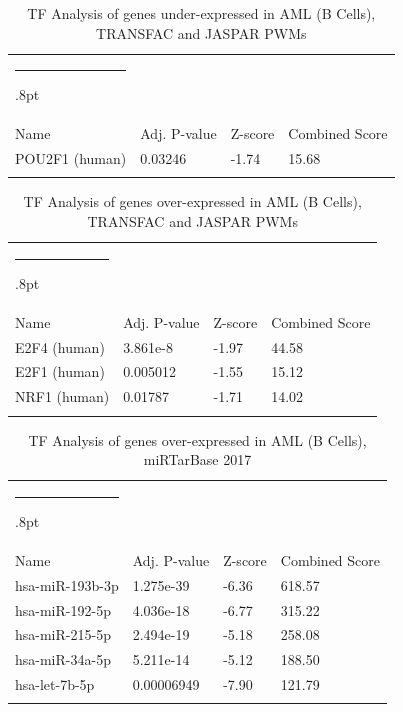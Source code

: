 \documentclass[3p,authoryear,preprint,12pt]{elsarticle}
\makeatletter
\def\hlinewd#1{%
  \noalign{\ifnum0=`}\fi\hrule \@height #1%
  \futurelet\reserved@a\@xhline}
\def\tbltoprule{\hlinewd{.8pt}\\[-12pt]}
\def\tblbottomrule{\noalign{\vspace*{6pt}}\hline\noalign{\vspace*{2pt}}}
\def\tblmidrule{\noalign{\vspace*{6pt}}\hline\noalign{\vspace*{2pt}}}
\makeatother
\begin{document}
\begin{table}[!htbp]
	\caption{{TF Analysis of genes under-expressed in AML (B Cells), TRANSFAC and JASPAR PWMs} }
	\label{tw-de478ae31cj6}
	\def\arraystretch{1}
	\ignorespaces 
	\centering 
	\begin{tabulary}{\linewidth}{p{\dimexpr.65\tabcolsep}p{\dimexpr.15\tabcolsep}p{\dimexpr.1\tabcolsep}p{\dimexpr.1\tabcolsep}}
		\tbltoprule Name & Adj. P-value & Z-score & Combined Score\\
		\tblmidrule
POU2F1 (human) & 0.03246 & -1.74 & 15.68 \\
		\tblbottomrule
	\end{tabulary}\par 
\end{table}
\begin{table}[!htbp]
	\caption{{TF Analysis of genes over-expressed in AML (B Cells), TRANSFAC and JASPAR PWMs} }
	\label{tw-de478ae31ck6}
	\def\arraystretch{1}
	\ignorespaces 
	\centering 
	\begin{tabulary}{\linewidth}{p{\dimexpr.65\tabcolsep}p{\dimexpr.15\tabcolsep}p{\dimexpr.1\tabcolsep}p{\dimexpr.1\tabcolsep}}
		\tbltoprule Name & Adj. P-value & Z-score & Combined Score\\
		\tblmidrule
E2F4 (human) & 3.861e-8 & -1.97 & 44.58 \\
E2F1 (human) & 0.005012 & -1.55 & 15.12 \\
NRF1 (human) & 0.01787 & -1.71 & 14.02 \\
		\tblbottomrule
	\end{tabulary}\par 
\end{table}
\begin{table}[!htbp]
	\caption{{TF Analysis of genes over-expressed in AML (B Cells), miRTarBase 2017} }
	\label{tw-de478ae31cl6}
	\def\arraystretch{1}
	\ignorespaces 
	\centering 
	\begin{tabulary}{\linewidth}{p{\dimexpr.65\tabcolsep}p{\dimexpr.15\tabcolsep}p{\dimexpr.1\tabcolsep}p{\dimexpr.1\tabcolsep}}
		\tbltoprule Name & Adj. P-value & Z-score & Combined Score\\
		\tblmidrule
hsa-miR-193b-3p & 1.275e-39 & -6.36 & 618.57 \\
hsa-miR-192-5p & 4.036e-18 & -6.77 & 315.22 \\
hsa-miR-215-5p & 2.494e-19 & -5.18 & 258.08 \\
hsa-miR-34a-5p & 5.211e-14 & -5.12 & 188.50 \\
hsa-let-7b-5p & 0.00006949 & -7.90 & 121.79 \\
		\tblbottomrule
	\end{tabulary}\par 
\end{table}
\end{document}
